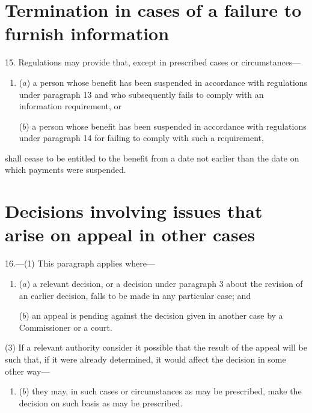 \documentclass[12pt,a4paper]{article}
\begin{document}

\section*{Termination in cases of a failure to furnish information}

15. Regulations may provide that, except in prescribed cases or circumstances—
\begin{enumerate}\item[]
($a$) a person whose benefit has been suspended in accordance with regulations under paragraph 13 and who subsequently fails to comply with an information requirement, or

($b$) a person whose benefit has been suspended in accordance with regulations under paragraph 14 for failing to comply with such a requirement,
\end{enumerate}
shall cease to be entitled to the benefit from a date not earlier than the date on which payments were suspended.


\section*{Decisions involving issues that arise on appeal in other cases}

16.---(1) This paragraph applies where—
\begin{enumerate}\item[]
($a$) a relevant decision, or a decision under paragraph 3 about the revision of an earlier decision, falls to be made in any particular case; and

($b$) an appeal is pending against the decision given in another case by a Commissioner or a court.
\end{enumerate}


(3) If a relevant authority consider it possible that the result of the appeal will be such that, if it were already determined, it would affect the decision in some other way—
\begin{enumerate}\item[]

($b$) they may, in such cases or circumstances as may be prescribed, make the decision on such basis as may be prescribed.
\end{enumerate}
\end{document}
